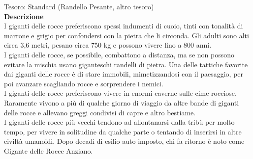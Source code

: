 \begin{multicols}{2}
Tesoro: Standard (Randello Pesante, altro tesoro)\\
\textbf{Descrizione}\\
I giganti delle rocce preferiscono spessi indumenti di cuoio, tinti con tonalità di marrone e grigio per confondersi con la pietra che li circonda. Gli adulti sono alti circa 3,6 metri, pesano circa 750 kg e possono vivere fino a 800 anni.\\
I giganti delle rocce, se possibile, combattono a distanza, ma se non possono evitare la mischia usano giganteschi randelli di pietra. Una delle tattiche favorite dai giganti delle rocce è di stare immobili, mimetizzandosi con il paesaggio, per poi avanzare scagliando rocce e sorprendere i nemici.\\

I giganti delle rocce preferiscono vivere in enormi caverne sulle cime rocciose. Raramente vivono a più di qualche giorno di viaggio da altre bande di giganti delle rocce e allevano greggi condivisi di capre e altro bestiame.\\

I giganti delle rocce più vecchi tendono ad allontanarsi dalla tribù per molto tempo, per vivere in solitudine da qualche parte o tentando di inserirsi in altre civiltà umanoidi. Dopo decadi di esilio auto imposto, chi fa ritorno è noto come Gigante delle Rocce Anziano.\\


\end{multicols}
